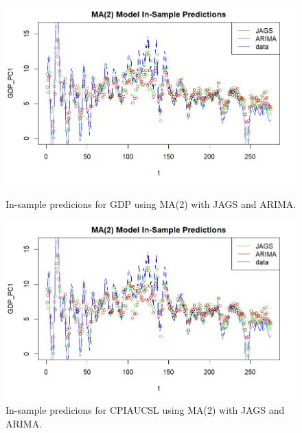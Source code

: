 \begin{figure}[H]
    \centering
    \begin{minipage}{0.49\textwidth}
        \centering
        \includegraphics[width=\textwidth]{images/3-MA/ARIMA_MA2_predictions_gdp.png}
        \caption{In-sample predicions for GDP using MA(2) with JAGS and ARIMA.}
        \label{fig:ARIMA_MA2_gdp_prediction}
    \end{minipage}\hfill
    \begin{minipage}{0.49\textwidth}
        \centering
        \includegraphics[width=\textwidth]{images/3-MA/ARIMA_MA2_predictions_gdp.png}
        \caption{In-sample predicions for CPIAUCSL using MA(2) with JAGS and ARIMA.}
        \label{fig:ARIMA_MA2_infl_prediction}
    \end{minipage}
\end{figure}
